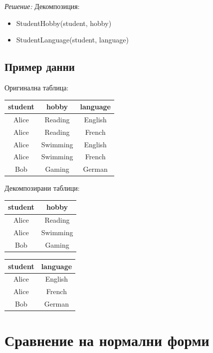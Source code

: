 \documentclass{scrartcl}
\begin{document}
\begin{FlushLeft}
\textit{Решение:} Декомпозиция:
\begin{itemize}
    \item StudentHobby(student, hobby)
    \item StudentLanguage(student, language)
\end{itemize}

\subsection{Пример данни}

Оригинална таблица:

\begin{center}
\begin{tabular}{|c|c|c|}
\hline
student & hobby & language \\
\hline
Alice & Reading & English \\
Alice & Reading & French \\
Alice & Swimming & English \\
Alice & Swimming & French \\
Bob & Gaming & German \\
\hline
\end{tabular}
\end{center}

Декомпозирани таблици:

\begin{center}
\begin{tabular}{|c|c|}
\hline
student & hobby \\
\hline
Alice & Reading \\
Alice & Swimming \\
Bob & Gaming \\
\hline
\end{tabular}
\qquad
\begin{tabular}{|c|c|}
\hline
student & language \\
\hline
Alice & English \\
Alice & French \\
Bob & German \\
\hline
\end{tabular}
\end{center}

\section{Сравнение на нормални форми}


\end{FlushLeft}
\end{document}
